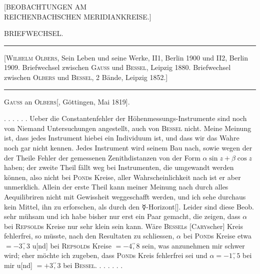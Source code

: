 \clearpage\begingroup
\newfontfamily{}
\NoSourceHead
\begin{center}
{\large [BEOBACHTUNGEN AM\\REICHENBACHSCHEN MERIDIANKREISE.]}\par\medskip
BRIEFWECHSEL.\par\medskip
\rule{\textwidth}{.3pt}\par
{\small [\textsc{Wilhelm Olbers}, Sein Leben und seine Werke, II1, Berlin 1900 und II2, Berlin 1909. Briefwechsel zwischen \textsc{Gauss} und \textsc{Bessel}, Leipzig 1880. Briefwechsel zwischen \textsc{Olbers} und \textsc{Bessel}, 2 Bände, Leipzig 1852.]}\par
\rule{\textwidth}{.3pt}\par\medskip
\textsc{Gauss} an \textsc{Olbers}[, Göttingen, Mai 1819].
\end{center}

\noindent\hspace*{\parindent}. . . . . . Ueber die Constantenfehler der Höhenmessungs-Instrumente sind noch von Niemand Untersuchungen angestellt, auch von \textsc{Bessel} nicht. Meine Meinung ist, dass jedes Instrument hiebei ein Individuum ist, und dass wir das Wahre noch gar nicht kennen. Jedes Instrument wird seinem Bau nach, sowie wegen der  der Theile Fehler der gemessenen Zenithdistanzen von der Form \(\alpha\sin z+\beta\cos z\) haben; der zweite Theil fällt weg bei Instrumenten, die umgewandt werden können, also nicht bei \textsc{Pond}s Kreise, aller Wahrscheinlichkeit nach ist er aber unmerklich. Allein der erste Theil kann meiner Meinung nach durch alles Aequilibriren nicht mit Gewissheit weggeschafft werden, und ich sehe durchaus kein Mittel, ihn zu erforschen, als durch den {\ReichenbachSymbolFont ☿}-Horizont[\begingroup\renewcommand{\thefootnote}{*)}\footnotemark\renewcommand{\thefootnote}{[*)}\footnotetext{{\ReichenbachSymbolFont ☿} \(=\) Quecksilber.]}\endgroup]. Leider sind diese Beob. sehr mühsam und ich habe bisher nur erst ein Paar gemacht, die zeigen, dass \(\alpha\) bei \textsc{Repsold}s Kreise nur sehr klein sein kann. Wäre \textsc{Bessel}s [\textsc{Cary}scher] Kreis fehlerfrei, so müsste, nach den Resultaten zu schliessen, \(\alpha\) bei \textsc{Pond}s Kreise
\clearpage{}
\noindent etwa \(=-3\overset{\prime\prime}{,}3\) u[nd] bei \textsc{Repsold}s Kreise \(=-4\overset{\prime\prime}{,}8\) sein, was anzunehmen mir schwer wird; eher möchte ich zugeben, dass \textsc{Pond}s Kreis fehlerfrei sei und \(\alpha=-1\overset{\prime\prime}{,}5\) bei mir u[nd] \(=+3\overset{\prime\prime}{,}3\) bei \textsc{Bessel}. . . . . . .

